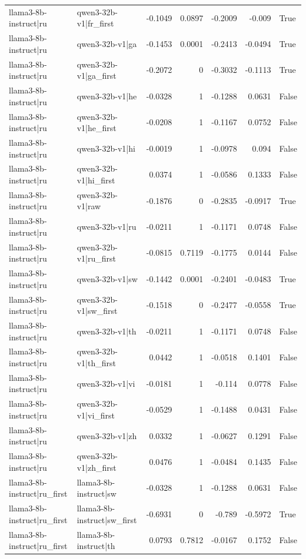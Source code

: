 \begin{table}
\begin{tabular}{l l r r r r l}
llama3-8b-instruct|ru & qwen3-32b-v1|fr_first & -0.1049 & 0.0897 & -0.2009 & -0.009 & True \\
llama3-8b-instruct|ru & qwen3-32b-v1|ga & -0.1453 & 0.0001 & -0.2413 & -0.0494 & True \\
llama3-8b-instruct|ru & qwen3-32b-v1|ga_first & -0.2072 & 0 & -0.3032 & -0.1113 & True \\
llama3-8b-instruct|ru & qwen3-32b-v1|he & -0.0328 & 1 & -0.1288 & 0.0631 & False \\
llama3-8b-instruct|ru & qwen3-32b-v1|he_first & -0.0208 & 1 & -0.1167 & 0.0752 & False \\
llama3-8b-instruct|ru & qwen3-32b-v1|hi & -0.0019 & 1 & -0.0978 & 0.094 & False \\
llama3-8b-instruct|ru & qwen3-32b-v1|hi_first & 0.0374 & 1 & -0.0586 & 0.1333 & False \\
llama3-8b-instruct|ru & qwen3-32b-v1|raw & -0.1876 & 0 & -0.2835 & -0.0917 & True \\
llama3-8b-instruct|ru & qwen3-32b-v1|ru & -0.0211 & 1 & -0.1171 & 0.0748 & False \\
llama3-8b-instruct|ru & qwen3-32b-v1|ru_first & -0.0815 & 0.7119 & -0.1775 & 0.0144 & False \\
llama3-8b-instruct|ru & qwen3-32b-v1|sw & -0.1442 & 0.0001 & -0.2401 & -0.0483 & True \\
llama3-8b-instruct|ru & qwen3-32b-v1|sw_first & -0.1518 & 0 & -0.2477 & -0.0558 & True \\
llama3-8b-instruct|ru & qwen3-32b-v1|th & -0.0211 & 1 & -0.1171 & 0.0748 & False \\
llama3-8b-instruct|ru & qwen3-32b-v1|th_first & 0.0442 & 1 & -0.0518 & 0.1401 & False \\
llama3-8b-instruct|ru & qwen3-32b-v1|vi & -0.0181 & 1 & -0.114 & 0.0778 & False \\
llama3-8b-instruct|ru & qwen3-32b-v1|vi_first & -0.0529 & 1 & -0.1488 & 0.0431 & False \\
llama3-8b-instruct|ru & qwen3-32b-v1|zh & 0.0332 & 1 & -0.0627 & 0.1291 & False \\
llama3-8b-instruct|ru & qwen3-32b-v1|zh_first & 0.0476 & 1 & -0.0484 & 0.1435 & False \\
llama3-8b-instruct|ru_first & llama3-8b-instruct|sw & -0.0328 & 1 & -0.1288 & 0.0631 & False \\
llama3-8b-instruct|ru_first & llama3-8b-instruct|sw_first & -0.6931 & 0 & -0.789 & -0.5972 & True \\
llama3-8b-instruct|ru_first & llama3-8b-instruct|th & 0.0793 & 0.7812 & -0.0167 & 0.1752 & False \\

\end{tabular}
\end{table}
